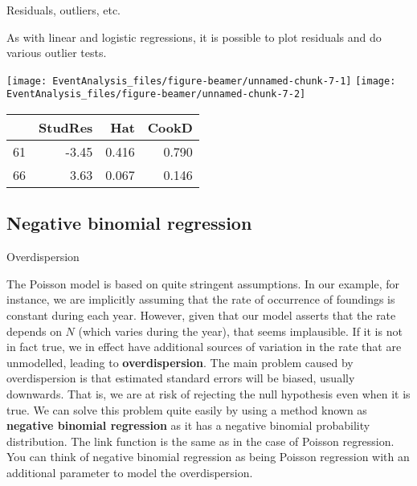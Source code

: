 \documentclass[10pt,ignorenonframetext,]{beamer}
\begin{document}
\begin{frame}{Residuals, outliers, etc.}

As with linear and logistic regressions, it is possible to plot
residuals and do various outlier tests.

\texttt{[image: EventAnalysis\_files/figure-beamer/unnamed-chunk-7-1]}
\texttt{[image: EventAnalysis\_files/figure-beamer/unnamed-chunk-7-2]}

\begin{longtable}[]{@{}lrrr@{}}
\toprule
& StudRes & Hat & CookD\tabularnewline
\midrule
\endhead
61 & -3.45 & 0.416 & 0.790\tabularnewline
66 & 3.63 & 0.067 & 0.146\tabularnewline
\bottomrule
\end{longtable}

\end{frame}

\subsection{Negative binomial
regression}\label{negative-binomial-regression}

\begin{frame}{Overdispersion}

The Poisson model is based on quite stringent assumptions. In our
example, for instance, we are implicitly assuming that the rate of
occurrence of foundings is constant during each year. However, given
that our model asserts that the rate depends on \(N\) (which varies
during the year), that seems implausible. If it is not in fact true, we
in effect have additional sources of variation in the rate that are
unmodelled, leading to \textbf{overdispersion}. The main problem caused
by overdispersion is that estimated standard errors will be biased,
usually downwards. That is, we are at risk of rejecting the null
hypothesis even when it is true. We can solve this problem quite easily
by using a method known as \textbf{negative binomial regression} as it
has a negative binomial probability distribution. The link function is
the same as in the case of Poisson regression. You can think of negative
binomial regression as being Poisson regression with an additional
parameter to model the overdispersion.

\end{frame}
\end{document}
